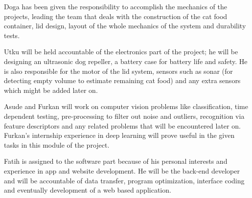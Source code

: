Doga has been given the responsibility to accomplish the mechanics of the projects, leading the team that deals with the construction of the cat food container, lid design, layout of the whole mechanics of the system and durability tests. 

Utku will be held accountable of the electronics part of the project; he will be designing an ultrasonic dog repeller, a battery case for battery life and safety. He is also responsible for the motor of the lid system, sensors such as sonar (for detecting empty volume to estimate remaining cat food) and any extra sensors which might be added later on. 

Asude and Furkan will work on computer vision problems like classification, time dependent testing, pre-processing to filter out noise and outliers, recognition via feature descriptors and any related problems that will be encountered later on. Furkan's internship experience in deep learning will prove useful in the given tasks in this module of the project. 

Fatih is assigned to the software part because of his personal interests and experience in app and website development. He will be the back-end developer and will be accountable of data transfer, program optimization, interface coding and eventually development of a web based application.





